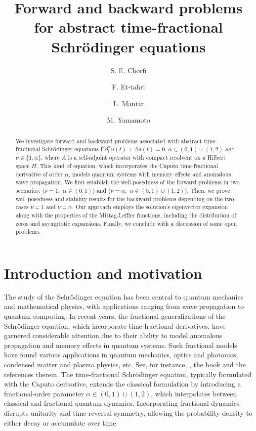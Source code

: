 \documentclass[reqno]{amsart}
\title[Abstract time-fractional Schrödinger equations]{Forward and backward problems for abstract time-fractional Schrödinger equations}
\author{S. E. Chorfi}
\author{F. Et-tahri}
\author{L. Maniar}
\author{M. Yamamoto}
\numberwithin{equation}{section}
\begin{document}
\begin{abstract}
We investigate forward and backward problems associated with abstract time-fractional Schrödinger equations $\mathrm{i}^\nu \partial_t^\alpha u(t) + A u(t)=0$, $\alpha \in (0,1)\cup (1,2)$ and $\nu\in\{1,\alpha\}$, where $A$ is a self-adjoint operator with compact resolvent on a Hilbert space $H$. This kind of equation, which incorporates the Caputo time-fractional derivative of order $\alpha$, models quantum systems with memory effects and anomalous wave propagation. We first establish the well-posedness of the forward problems in two scenarios: ($\nu=1$,\, $\alpha \in (0,1)$) and ($\nu=\alpha$,\, $\alpha \in (0,1)\cup (1,2)$). Then, we prove well-posedness and stability results for the backward problems depending on the two cases $\nu=1$ and $\nu=\alpha$. Our approach employs the solution's eigenvector expansion along with the properties of the Mittag-Leffler functions, including the distribution of zeros and asymptotic expansions. Finally, we conclude with a discussion of some open problems.
\end{abstract}

\maketitle

\section{Introduction and motivation}
The study of the Schrödinger equation has been central to quantum mechanics and mathematical physics, with applications ranging from wave propagation to quantum computing. In recent years, the fractional generalizations of the Schrödinger equation, which incorporate time-fractional derivatives, have garnered considerable attention due to their ability to model anomalous propagation and memory effects in quantum systems. Such fractional models have found various applications in quantum mechanics, optics and photonics, condensed matter and plasma physics, etc. See, for instance, \cite{Liu23, Na04, Zu21}, the book \cite{La18} and the references therein. The time-fractional Schrödinger equation, typically formulated with the Caputo derivative, extends the classical formulation by introducing a fractional-order parameter $\alpha\in (0,1)\cup (1,2)$, which interpolates between classical and fractional quantum dynamics. Incorporating fractional dynamics disrupts unitarity and time-reversal symmetry, allowing the probability density to either decay or accumulate over time.
\end{document}
